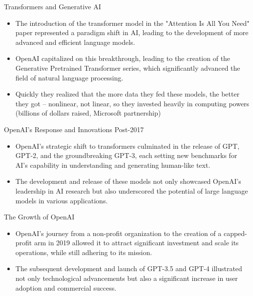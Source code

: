 \documentclass{beamer}
\begin{document}
\begin{frame}{Transformers and Generative AI}
\begin{itemize}
  \item The introduction of the transformer model in the "Attention Is All You Need" paper represented a paradigm shift in AI, leading to the development of more advanced and efficient language models.
  \item OpenAI capitalized on this breakthrough, leading to the creation of the Generative Pretrained Transformer series, which significantly advanced the field of natural language processing.
  \item Quickly they realized that the more data they fed these models, the better they got -- nonlinear, not linear, so they invested heavily in computing powers (billions of dollars raised, Microsoft partnership)
\end{itemize}
\end{frame}

\begin{frame}{OpenAI's Response and Innovations Post-2017}
\begin{itemize}
  \item OpenAI's strategic shift to transformers culminated in the release of GPT, GPT-2, and the groundbreaking GPT-3, each setting new benchmarks for AI's capability in understanding and generating human-like text.
  \item The development and release of these models not only showcased OpenAI's leadership in AI research but also underscored the potential of large language models in various applications.
\end{itemize}
\end{frame}

\begin{frame}{The Growth of OpenAI}
\begin{itemize}
  \item OpenAI's journey from a non-profit organization to the creation of a capped-profit arm in 2019 allowed it to attract significant investment and scale its operations, while still adhering to its mission.
  \item The subsequent development and launch of GPT-3.5 and GPT-4 illustrated not only technological advancements but also a significant increase in user adoption and commercial success.
\end{itemize}
\end{frame}
\end{document}
